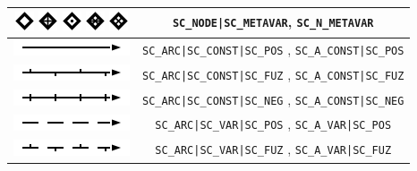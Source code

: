 \begin{table}[ht]
\begin{tabular}{|c|c|}
    \hline
    \includegraphics{images/4/scg2sc/node_general_meta}
    \includegraphics{images/4/scg2sc/node_role_meta}
    \includegraphics{images/4/scg2sc/node_struct_meta}
    \includegraphics{images/4/scg2sc/node_concept_meta}
    \includegraphics{images/4/scg2sc/node_binary_meta}
    & \verb+SC_NODE|SC_METAVAR+, \verb+SC_N_METAVAR+ \\
    
    \hline
	\includegraphics{images/4/scg2sc/arc_main} & \verb+SC_ARC|SC_CONST|SC_POS+
    , \verb+SC_A_CONST|SC_POS+ \\
    
    \hline
	\includegraphics{images/4/scg2sc/pair_const_perm_fuz} & \verb+SC_ARC|SC_CONST|SC_FUZ+
    , \verb+SC_A_CONST|SC_FUZ+ \\
    
    \hline
	\includegraphics{images/4/scg2sc/pair_const_perm_neg} & \verb+SC_ARC|SC_CONST|SC_NEG+
    , \verb+SC_A_CONST|SC_NEG+ \\
    
    \hline
	\includegraphics{images/4/scg2sc/pair_var_perm_pos} & \verb+SC_ARC|SC_VAR|SC_POS+
    , \verb+SC_A_VAR|SC_POS+ \\
    
    \hline
	\includegraphics{images/4/scg2sc/pair_var_perm_fuz} & \verb+SC_ARC|SC_VAR|SC_FUZ+
    , \verb+SC_A_VAR|SC_FUZ+ \\
    

\end{tabular}
\end{table}
